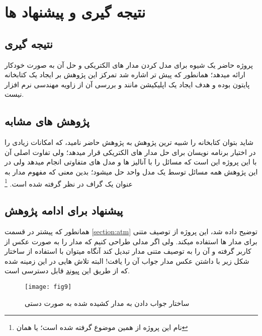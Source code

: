 \chapter{ نتیجه گیری و پیشنهاد ها}
\section{
نتیجه گیری
}
پروژه حاضر یک شیوه برای مدل کردن مدار های الکتریکی و حل آن به صورت خودکار ارائه میدهد؛
همانطور که پیش تر اشاره شد تمرکز این پژوهش بر ایجاد یک کتابخانه پایتون بوده و هدف ایجاد یک اپلیکیشن مانند
و بررسی آن از زاویه مهندسی نرم افزار نیست.
\section{
	پژوهش های مشابه
}
شاید بتوان کتابخانه
را شبیه ترین پژوهش به پژوهش حاضر نامید،
که امکانات زیادی را در اختیار برنامه نویسان برای حل مدار های الکتریکی قرار میدهد؛
ولی تفاوت اصلی آن با این پروژه این است که
مسائل را با آنالیز ها و مدل های متفاوتی انجام میدهد ولی در این پژوهش همه مسائل توسط یک مدل واحد حل میشود؛ بدین معنی که مفهوم مدار به عنوان یک گراف در نظر گرفته شده است.
\footnote{
	نام این پروژه از همین موضوع گرفته شده است؛
	یا همان
}

\section{پیشنهاد برای ادامه پژوهش}
همانطور که پیشتر در قسمت
\ref{section:atm}
توضیح داده شد،
 این پروژه از توصیف متنی برای مدار ها استفاده میکند. ولی اگر مدلی طراحی کنیم که مدار را به صورت عکس از کاربر گرفته و آن را به توصیف متنی مدار تبدیل کند آنگاه میتوان با استفاده از ساختار شکل 
 زیر با داشتن عکس مدار جواب آن را یافت!
 البته تلاش هایی در این زمینه شده که از طریق این
 \href{https://github.com/Mehrdadghassabi/Hand-Drawn-Circuits}{پیوند} 
  قابل دسترسی است.
  
\begin{figure}[ht]
	\centerline{\texttt{[image: fig9]}}
	\caption{ساختار جواب دادن به مدار کشیده شده به صورت دستی
	}
\end{figure}
